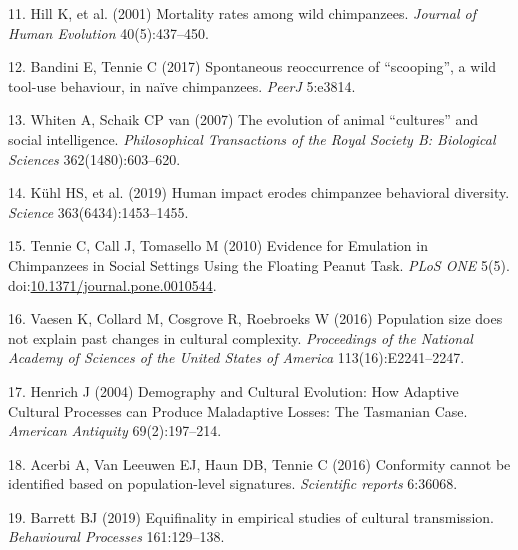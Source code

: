 \documentclass[9pt,twocolumn,twoside,]{pnas-new}
\begin{document}
\hypertarget{ref-hill_mortality_2001}{}
11. Hill K, et al. (2001) Mortality rates among wild chimpanzees.
\emph{Journal of Human Evolution} 40(5):437--450.

\hypertarget{ref-bandini_spontaneous_2017}{}
12. Bandini E, Tennie C (2017) Spontaneous reoccurrence of ``scooping'',
a wild tool-use behaviour, in naïve chimpanzees. \emph{PeerJ} 5:e3814.

\hypertarget{ref-whiten_evolution_2007}{}
13. Whiten A, Schaik CP van (2007) The evolution of animal ``cultures''
and social intelligence. \emph{Philosophical Transactions of the Royal
Society B: Biological Sciences} 362(1480):603--620.

\hypertarget{ref-kuhl_human_2019}{}
14. Kühl HS, et al. (2019) Human impact erodes chimpanzee behavioral
diversity. \emph{Science} 363(6434):1453--1455.

\hypertarget{ref-tennie_evidence_2010}{}
15. Tennie C, Call J, Tomasello M (2010) Evidence for Emulation in
Chimpanzees in Social Settings Using the Floating Peanut Task.
\emph{PLoS ONE} 5(5).
doi:\href{https://doi.org/10.1371/journal.pone.0010544}{10.1371/journal.pone.0010544}.

\hypertarget{ref-vaesen_population_2016}{}
16. Vaesen K, Collard M, Cosgrove R, Roebroeks W (2016) Population size
does not explain past changes in cultural complexity. \emph{Proceedings
of the National Academy of Sciences of the United States of America}
113(16):E2241--2247.

\hypertarget{ref-henrich_demography_2004}{}
17. Henrich J (2004) Demography and Cultural Evolution: How Adaptive
Cultural Processes can Produce Maladaptive Losses: The Tasmanian Case.
\emph{American Antiquity} 69(2):197--214.

\hypertarget{ref-acerbi_conformity_2016}{}
18. Acerbi A, Van Leeuwen EJ, Haun DB, Tennie C (2016) Conformity cannot
be identified based on population-level signatures. \emph{Scientific
reports} 6:36068.

\hypertarget{ref-barrett_equifinality_2019}{}
19. Barrett BJ (2019) Equifinality in empirical studies of cultural
transmission. \emph{Behavioural Processes} 161:129--138.



% 
\end{document}
